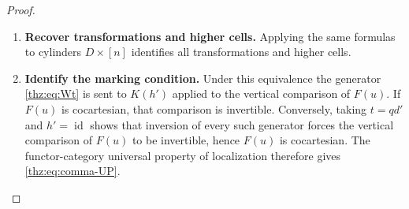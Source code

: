\documentclass[oneside]{article}
\theoremstyle{plain}
\theoremstyle{definition}
\theoremstyle{remark}
\newcommand{\id}{\operatorname{id}}
\begin{document}
\begin{proof}
\begin{enumerate}
\[\begin{tikzcd}[column sep=large]
\end{tikzcd}
\]
\item \textbf{Recover transformations and higher cells.} Applying the same formulas to cylinders $D\times[n]$ identifies all
transformations and higher cells.
\item \textbf{Identify the marking condition.} Under this equivalence the generator \eqref{thz:eq:Wt} is sent to
$K(h')$ applied to the vertical comparison of $F(u)$.  If $F(u)$ is
cocartesian, that comparison is invertible.  Conversely, taking
$t=qd'$ and $h'=\id$ shows that inversion of every such generator
forces the vertical comparison of $F(u)$ to be invertible, hence $F(u)$
is cocartesian.  The functor-category universal property of localization
therefore gives \eqref{thz:eq:comma-UP}.\qedhere
\end{enumerate}
\end{proof}
\end{document}
